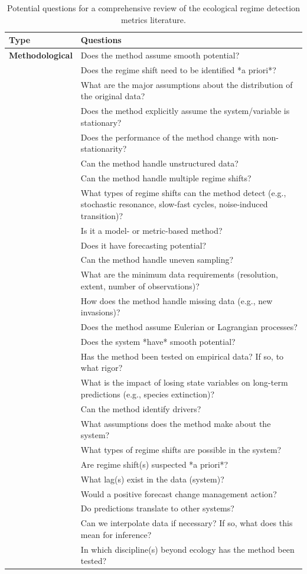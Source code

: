 \documentclass[print]{nuthesis}
\begin{document}
\begin{longtable}{>{\bfseries}l|>{\raggedright\arraybackslash}p{30em}}
\caption{\label{tab:nextStepsTab}Potential questions for a comprehensive review of the ecological regime detection metrics literature.}\\
\toprule
Type & Questions\\
\midrule
Methodological & Does the method assume smooth potential?\\
 & Does the regime shift need to be identified *a priori*?\\
 & What are the major assumptions about the distribution of the original data?\\
 & Does the method explicitly assume the system/variable is stationary?\\
 & Does the performance of the method change with non-stationarity?\\
\addlinespace
 & Can the method handle unstructured data?\\
 & Can the method handle multiple regime shifts?\\
 & What types of regime shifts can the method detect (e.g., stochastic resonance, slow-fast cycles, noise-induced transition)?\\
 & Is it a model- or metric-based method?\\
 & Does it have forecasting potential?\\
\addlinespace
 & Can the method handle uneven sampling?\\
 & What are the minimum data requirements (resolution, extent, number of observations)?\\
 & How does the method handle missing data (e.g., new invasions)?\\
 & Does the method assume Eulerian or Lagrangian processes?\\
 & Does the system *have* smooth potential?\\
\addlinespace
 & Has the method been tested on empirical data? If so, to what rigor?\\
 & What is the impact of losing state variables on long-term predictions (e.g., species extinction)?\\
 & Can the method identify drivers?\\
 & What assumptions does the method make about the system?\\
 & What types of regime shifts are possible in the system?\\
\addlinespace
 & Are regime shift(s) suspected *a priori*?\\
 & What lag(s) exist in the data (system)?\\
 & Would a positive forecast change management action?\\
 & Do predictions translate to other systems?\\
 & Can we interpolate data if necessary? If so, what does this mean for inference?\\
\addlinespace
 & In which discipline(s) beyond ecology has the method been tested?\\
\bottomrule
\end{longtable}
\end{document}
